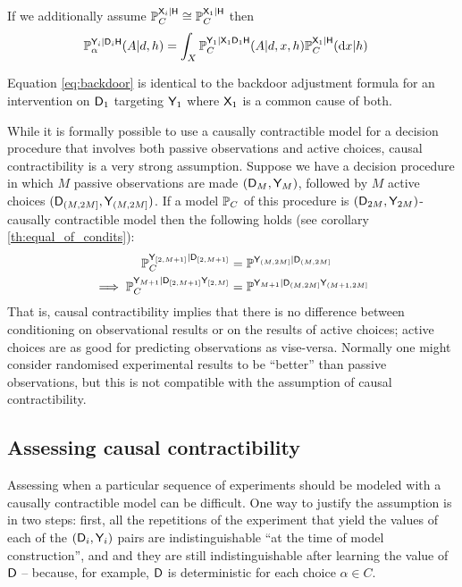 If we additionally assume $\mathbb{P}_C^{\mathsf{X}_{i}|\mathsf{H}}\cong \mathbb{P}_C^{\mathsf{X}_{1}|\mathsf{H}}$ then 
\begin{align}
    \mathbb{P}_\alpha^{\mathsf{Y}_{i}|\mathsf{D}_{i}\mathsf{H}}(A|d,h) &= \int_X \mathbb{P}_C^{\mathsf{Y}_{1}|\mathsf{X}_{1}\mathsf{D}_{1}\mathsf{H}}(A|d,x,h)\mathbb{P}_C^{\mathsf{X}_{1}|\mathsf{H}}(\mathrm{d}x|h)\label{eq:backdoor}
\end{align}

Equation \ref{eq:backdoor} is identical to the backdoor adjustment formula for an intervention on $\mathsf{D}_1$ targeting $\mathsf{Y}_1$ where $\mathsf{X}_1$ is a common cause of both.

While it is formally possible to use a causally contractible model for a decision procedure that involves both passive observations and active choices, causal contractibility is a very strong assumption. Suppose we have a decision procedure in which $M$ passive observations are made $(\mathsf{D}_M,\mathsf{Y}_M)$, followed by $M$ active choices $(\mathsf{D}_{(M,2M]},\mathsf{Y}_{(M,2M]})$. If a model $\mathbb{P}_C$ of this procedure is $(\mathsf{D}_{2M},\mathsf{Y}_{2M})$-causally contractible model then the following holds (see corollary \ref{th:equal_of_condits}):
\begin{align}
    \mathbb{P}^{\mathsf{Y}_{[2,M+1]}|\mathsf{D}_{[2,M+1]}}_C &= \mathbb{P}^{\mathsf{Y}_{(M,2M]}|\mathsf{D}_{(M,2M]}}\\
    \implies \mathbb{P}^{\mathsf{Y}_{M+1}|\mathsf{D}_{[2,M+1]}\mathsf{Y}_{[2,M]}}_C &= \mathbb{P}^{\mathsf{Y}_{M+1}|\mathsf{D}_{(M,2M]}\mathsf{Y}_{(M+1,2M]}}
\end{align}
That is, causal contractibility implies that there is no difference between conditioning on observational results or on the results of active choices; active choices are as good for predicting observations as vise-versa. Normally one might consider randomised experimental results to be ``better'' than passive observations, but this is not compatible with the assumption of causal contractibility.

\subsection{Assessing causal contractibility}\label{ssec:assessing}

Assessing when a particular sequence of experiments should be modeled with a causally contractible model can be difficult. One way to justify the assumption is in two steps: first, all the repetitions of the experiment that yield the values of each of the $(\mathsf{D}_i,\mathsf{Y}_i)$ pairs are indistinguishable ``at the time of model construction'', and and they are still indistinguishable after learning the value of $\mathsf{D}$ -- because, for example, $\mathsf{D}$ is deterministic for each choice $\alpha\in C$. 

